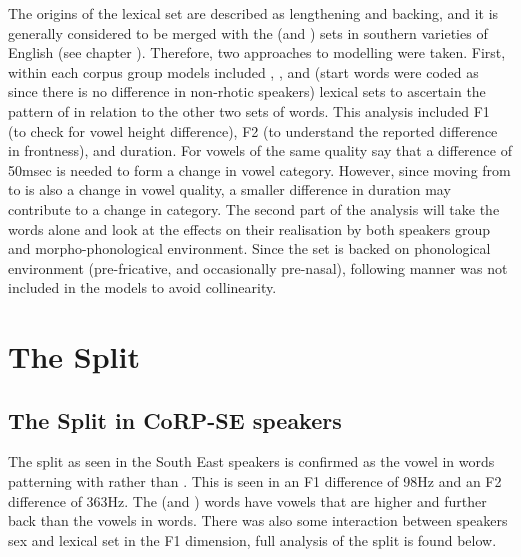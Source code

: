 \documentclass[../../../00.FullDoc/tex/ThesisSkeleton-draft2]{subfiles}
\begin{document}
The origins of the \bath{} lexical set are described as lengthening and backing, and it is generally considered to be merged with the \palm{} (and ) sets in southern varieties of English (see chapter \notinsubfile{\ref{ch:LitReviewSocio}}). Therefore, two approaches to modelling were taken. First, within each corpus group models included \trap{}, \bath{}, and \palm{} (start words were coded as \palm{} since there is no difference in non-rhotic speakers) lexical sets to ascertain the pattern of \bath{} in relation to the other two sets of words. This analysis included F1 (to check for vowel height difference), F2 (to understand the reported difference in frontness), and duration. For vowels of the same quality \cite{Labov2006} say that a difference of 50msec is needed to form a change in vowel category. However, since \bath{} moving from \trap{} to \palm{} is also a change in vowel quality, a smaller difference in duration may contribute to a change in category. The second part of the analysis will take the \bath{} words alone and look at the effects on their realisation by both speakers group and morpho-phonological environment. Since the \bath{} set is backed on phonological environment (pre-fricative, and occasionally pre-nasal), following manner was not included in the models to avoid collinearity.

	
\section{The Split} \label{sec:TBSplit}
\subsection{The Split in CoRP-SE speakers}
The \TB{} split as seen in the South East speakers is confirmed as the vowel in \bath{} words patterning with \palm{} rather than \trap{}. This is seen in an F1 difference of 98Hz and an F2 difference of  363Hz. The \bath{} (and \palm{}) words have vowels that are higher and further back than the vowels in \trap{} words.  There was also some interaction between speakers sex and lexical set in the F1 dimension, full analysis of the split is found below.
\end{document}
